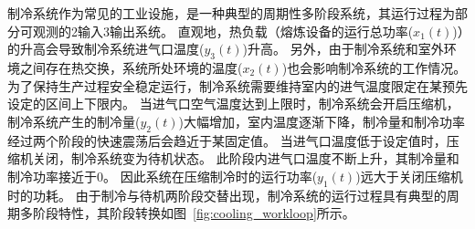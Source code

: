 制冷系统作为常见的工业设施，是一种典型的周期性多阶段系统，其运行过程为部分可观测的2输入3输出系统。
直观地，热负载（熔炼设备的运行总功率($x_1(t)$)）的升高会导致制冷系统进气口温度($y_3(t)$)升高。
另外，由于制冷系统和室外环境之间存在热交换，系统所处环境的温度($x_2(t)$)也会影响制冷系统的工作情况。
为了保持生产过程安全稳定运行，制冷系统需要维持室内的进气温度限定在某预先设定的区间上下限内。
当进气口空气温度达到上限时，制冷系统会开启压缩机，制冷系统产生的制冷量($y_2(t)$)大幅增加，室内温度逐渐下降，制冷量和制冷功率经过两个阶段的快速震荡后会趋近于某固定值。
当进气口温度低于设定值时，压缩机关闭，制冷系统变为待机状态。
此阶段内进气口温度不断上升，其制冷量和制冷功率接近于0。
因此系统在压缩制冷时的运行功率($y_1(t)$)远大于关闭压缩机时的功耗。
由于制冷与待机两阶段交替出现，制冷系统的运行过程具有典型的周期多阶段特性，其阶段转换如图~\ref{fig:cooling_workloop}所示。 

